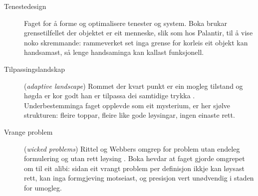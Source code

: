 \begin{description}
\item[Tenestedesign] Faget for å forme og optimalisere tenester og system. Boka brukar grensetilfellet der objektet er eit menneske, slik som hos Palantir, til å vise noko skremmande: rammeverket set inga grense for korleis eit objekt kan handsamast, så lenge handsaminga kan kallast funksjonell.

\item[Tilpassingslandskap] (\textit{adaptive landscape}) Rommet der kvart punkt er ein mogleg tilstand og høgda er kor godt han er tilpassa dei samtidige trykka \autocite{wright1932}. Underbestemminga faget opplevde som eit mysterium, er her sjølve strukturen: fleire toppar, fleire like gode løysingar, ingen einaste rett.

\item[Vrange problem] (\textit{wicked problems}) Rittel og Webbers omgrep for problem utan endeleg formulering og utan rett løysing \autocite{rittel1973}. Boka hevdar at faget gjorde omgrepet om til eit alibi: sidan eit vrangt problem per definisjon ikkje kan løysast rett, kan inga formgjeving motseiast, og presisjon vert unødvendig i staden for umogleg.

\end{description}
